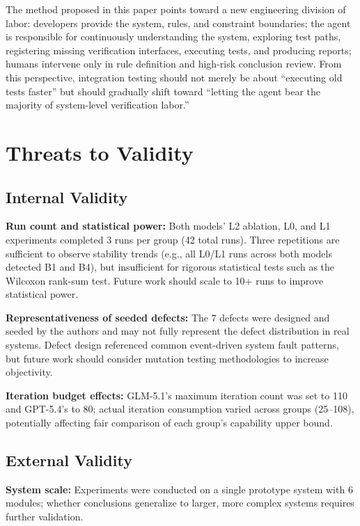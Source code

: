 \documentclass[sigconf,nonacm]{acmart}
\begin{document}
The method proposed in this paper points toward a new engineering division of labor: developers provide the system, rules, and constraint boundaries; the agent is responsible for continuously understanding the system, exploring test paths, registering missing verification interfaces, executing tests, and producing reports; humans intervene only in rule definition and high-risk conclusion review. From this perspective, integration testing should not merely be about ``executing old tests faster'' but should gradually shift toward ``letting the agent bear the majority of system-level verification labor.''

\section{Threats to Validity}

\subsection{Internal Validity}

\textbf{Run count and statistical power:} Both models' L2 ablation, L0, and L1 experiments completed 3 runs per group (42 total runs). Three repetitions are sufficient to observe stability trends (e.g., all L0/L1 runs across both models detected B1 and B4), but insufficient for rigorous statistical tests such as the Wilcoxon rank-sum test. Future work should scale to 10+ runs to improve statistical power.

\textbf{Representativeness of seeded defects:} The 7 defects were designed and seeded by the authors and may not fully represent the defect distribution in real systems. Defect design referenced common event-driven system fault patterns, but future work should consider mutation testing methodologies to increase objectivity.

\textbf{Iteration budget effects:} GLM-5.1's maximum iteration count was set to 110 and GPT-5.4's to 80; actual iteration consumption varied across groups (25--108), potentially affecting fair comparison of each group's capability upper bound.

\subsection{External Validity}

\textbf{System scale:} Experiments were conducted on a single prototype system with 6 modules; whether conclusions generalize to larger, more complex systems requires further validation.
\end{document}
